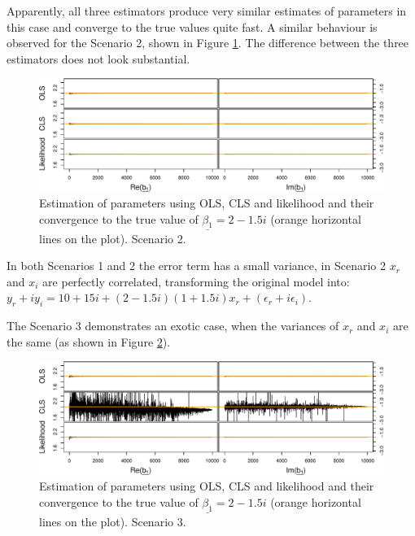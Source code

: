 \documentclass[
]{book}
\begin{document}
Apparently, all three estimators produce very similar estimates of parameters in this case and converge to the true values quite fast. A similar behaviour is observed for the Scenario 2, shown in Figure \ref{fig:parametersPC}. The difference between the three estimators does not look substantial.

\begin{figure}
\centering
\includegraphics{Svetunkov---Svetunkov---Complex-Dynamic-Models_files/figure-latex/parametersPC-1.pdf}
\caption{\label{fig:parametersPC}Estimation of parameters using OLS, CLS and likelihood and their convergence to the true value of \(\underline{\beta_1}=2-1.5i\) (orange horizontal lines on the plot). Scenario 2.}
\end{figure}

In both Scenarios 1 and 2 the error term has a small variance, in Scenario 2 \(x_r\) and \(x_i\) are perfectly correlated, transforming the original model into: \(y_r + i y_i = 10+15i + (2-1.5i) (1 + 1.5 i) x_r + (\epsilon_r + i \epsilon_i)\).

The Scenario 3 demonstrates an exotic case, when the variances of \(x_r\) and \(x_i\) are the same (as shown in Figure \ref{fig:parametersUCSV}).

\begin{figure}
\centering
\includegraphics{Svetunkov---Svetunkov---Complex-Dynamic-Models_files/figure-latex/parametersUCSV-1.pdf}
\caption{\label{fig:parametersUCSV}Estimation of parameters using OLS, CLS and likelihood and their convergence to the true value of \(\underline{\beta_1}=2-1.5i\) (orange horizontal lines on the plot). Scenario 3.}
\end{figure}
\end{document}
